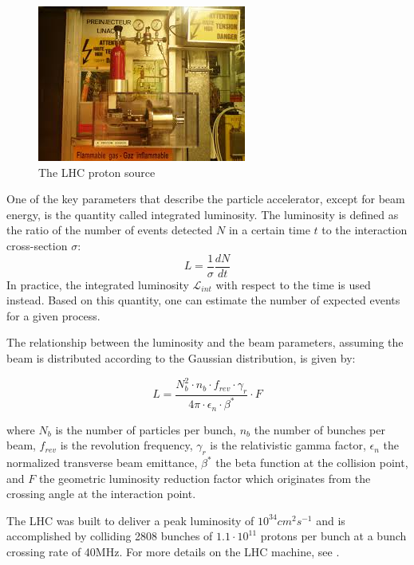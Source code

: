 \begin{figure}
\centering
\includegraphics[scale=0.6]{figures/Bottle.jpg}
\caption{The LHC proton source 
\label{fig:Bottle}}
\end{figure}

One of the key parameters that describe the particle accelerator, except for beam energy, is the quantity called integrated luminosity.  The luminosity is defined as  the ratio of the  number of events detected $N$ in a certain time $t$ to the interaction cross-section $\sigma$:  
\begin{equation}
    L = \frac{1}{\sigma} \frac{dN}{dt}
\end{equation}
In practice, the integrated luminosity $\mathcal{L}_{int}$ with respect to the time is used instead. Based on this quantity, one can estimate the number of expected events for a given process.  

The relationship between the luminosity and the beam parameters, assuming the beam is distributed according to the Gaussian distribution, is given by:

\begin{equation}
    L = \frac{N_{b}^2 \cdot n_b  \cdot f_{rev}  \cdot \gamma_{r}}{4 \pi \cdot \epsilon_n  \cdot \beta^* }  \cdot F
\end{equation}

where $N_b$ is the number of particles per bunch, $n_b$ the number of bunches per beam, $f_{rev}$ is the revolution frequency, $\gamma_{r}$ is the relativistic gamma factor, $\epsilon_n$ the normalized transverse beam emittance, $\beta^*$ the beta function at the  collision point, and $F$ the geometric luminosity reduction factor which originates from the crossing angle at the interaction point. 


The LHC was built to deliver a peak luminosity of $10^{34} cm^2s^{-1}$ and is accomplished by colliding 2808 bunches of $1.1 \cdot 10^{11}$ protons per bunch at a bunch crossing rate of 40MHz.  For more details on the LHC machine, see \cite{LHC_machine}.

